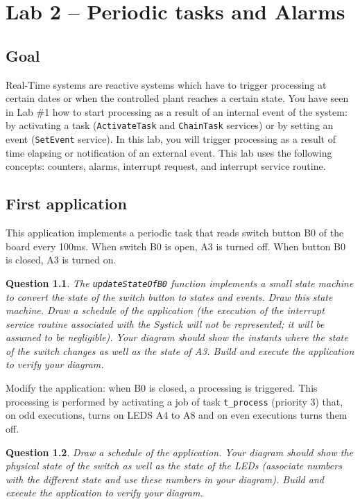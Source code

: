 \documentclass[11pt]{report}
\newtheorem{ex}{Question}
\begin{document}
\chapter{Lab 2 -- Periodic tasks and Alarms}

\section{Goal}

Real-Time systems are reactive systems which have to trigger processing at certain dates or when the controlled plant reaches a certain state.
You have seen in Lab \#1 how to start processing as a result of an internal event of the system: by activating a task (\texttt{ActivateTask} and \texttt{ChainTask} services) or by setting an event (\texttt{SetEvent} service).
In this lab, you will trigger processing as a result of time elapsing or notification of an external event.
This lab uses the following concepts: counters, alarms, interrupt request, and interrupt service routine.

\section{First application}

This application implements a periodic task that reads switch button B0 of the board every 100ms.
When switch B0 is open, A3 is turned off.
When button B0 is closed, A3 is turned on.

\begin{ex}
    The \texttt{updateStateOfB0} function implements a small state machine to convert the state of the switch button to states and events.
    Draw this state machine.
    Draw a schedule of the application (the execution of the interrupt service routine associated with the Systick will not be represented; it will be assumed to be negligible).
    Your diagram should show the instants where the state of the switch changes as well as the state of A3.
    Build and execute the application to verify your diagram.
\end{ex}

Modify the application: when B0 is closed, a processing is triggered.
This processing is performed by activating a job of task \texttt{t_process} (priority 3) that, on odd executions, turns on LEDS A4 to A8 and on even executions turns them off.
\begin{ex}
Draw a schedule of the application.
Your diagram should show the physical state of the switch as well as the state of the LEDs (associate numbers with the different state and use these numbers in your diagram).
Build and execute the application to verify your diagram.
\end{ex}
\end{document}
